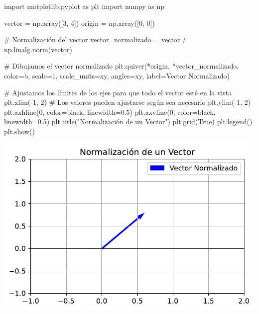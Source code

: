 \documentclass[
  letterpaper,
  DIV=11,
  numbers=noendperiod]{scrartcl}
\newenvironment{Shaded}{\begin{snugshade}}{\end{snugshade}}
\newcommand{\CommentTok}[1]{\textcolor[rgb]{0.37,0.37,0.37}{#1}}
\newcommand{\DecValTok}[1]{\textcolor[rgb]{0.68,0.00,0.00}{#1}}
\newcommand{\FloatTok}[1]{\textcolor[rgb]{0.68,0.00,0.00}{#1}}
\newcommand{\ImportTok}[1]{\textcolor[rgb]{0.00,0.46,0.62}{#1}}
\newcommand{\NormalTok}[1]{\textcolor[rgb]{0.00,0.23,0.31}{#1}}
\newcommand{\OperatorTok}[1]{\textcolor[rgb]{0.37,0.37,0.37}{#1}}
\newcommand{\StringTok}[1]{\textcolor[rgb]{0.13,0.47,0.30}{#1}}
\newcommand{\VariableTok}[1]{\textcolor[rgb]{0.07,0.07,0.07}{#1}}
\begin{document}
\begin{Shaded}
\begin{Highlighting}[]
\ImportTok{import}\NormalTok{ matplotlib.pyplot }\ImportTok{as}\NormalTok{ plt}
\ImportTok{import}\NormalTok{ numpy }\ImportTok{as}\NormalTok{ np}

\NormalTok{vector }\OperatorTok{=}\NormalTok{ np.array([}\DecValTok{3}\NormalTok{, }\DecValTok{4}\NormalTok{])}
\NormalTok{origin }\OperatorTok{=}\NormalTok{ np.array([}\DecValTok{0}\NormalTok{, }\DecValTok{0}\NormalTok{])}

\CommentTok{\# Normalización del vector}
\NormalTok{vector\_normalizado }\OperatorTok{=}\NormalTok{ vector }\OperatorTok{/}\NormalTok{ np.linalg.norm(vector)}

\CommentTok{\# Dibujamos el vector normalizado}
\NormalTok{plt.quiver(}\OperatorTok{*}\NormalTok{origin, }\OperatorTok{*}\NormalTok{vector\_normalizado, color}\OperatorTok{=}\StringTok{\textquotesingle{}b\textquotesingle{}}\NormalTok{, scale}\OperatorTok{=}\DecValTok{1}\NormalTok{, scale\_units}\OperatorTok{=}\StringTok{\textquotesingle{}xy\textquotesingle{}}\NormalTok{, angles}\OperatorTok{=}\StringTok{\textquotesingle{}xy\textquotesingle{}}\NormalTok{, label}\OperatorTok{=}\StringTok{\textquotesingle{}Vector Normalizado\textquotesingle{}}\NormalTok{)}

\CommentTok{\# Ajustamos los límites de los ejes para que todo el vector esté en la vista}
\NormalTok{plt.xlim(}\OperatorTok{{-}}\DecValTok{1}\NormalTok{, }\DecValTok{2}\NormalTok{)  }\CommentTok{\# Los valores pueden ajustarse según sea necesario}
\NormalTok{plt.ylim(}\OperatorTok{{-}}\DecValTok{1}\NormalTok{, }\DecValTok{2}\NormalTok{)}
\NormalTok{plt.axhline(}\DecValTok{0}\NormalTok{, color}\OperatorTok{=}\StringTok{\textquotesingle{}black\textquotesingle{}}\NormalTok{, linewidth}\OperatorTok{=}\FloatTok{0.5}\NormalTok{)}
\NormalTok{plt.axvline(}\DecValTok{0}\NormalTok{, color}\OperatorTok{=}\StringTok{\textquotesingle{}black\textquotesingle{}}\NormalTok{, linewidth}\OperatorTok{=}\FloatTok{0.5}\NormalTok{)}
\NormalTok{plt.title(}\StringTok{"Normalización de un Vector"}\NormalTok{)}
\NormalTok{plt.grid(}\VariableTok{True}\NormalTok{)}
\NormalTok{plt.legend()}
\NormalTok{plt.show()}
\end{Highlighting}
\end{Shaded}

\includegraphics{presentacion_files/figure-pdf/cell-5-output-1.pdf}
\end{document}

